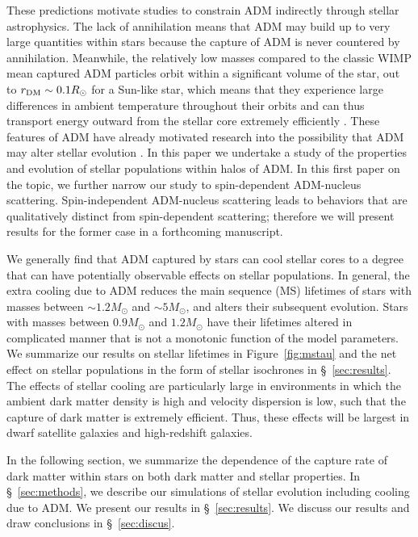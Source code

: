 \documentclass[useAMS,usenatbib]{mnras}
\begin{document}
  
  These predictions motivate studies to 
  constrain ADM indirectly through stellar astrophysics. The lack of 
  annihilation means that ADM may build up to very large
  quantities within stars because the capture of ADM is never countered 
  by annihilation. Meanwhile, the relatively low masses 
  compared to the classic WIMP mean captured ADM particles orbit within 
  a significant volume of the star, out to $r_{\mathrm{DM}} \sim 0.1 R_{\odot}$
  for a Sun-like star, which means that they experience large differences 
  in ambient temperature 
  throughout their orbits and can thus transport energy outward from the 
  stellar core extremely efficiently \citep{Spergel1985EffectInterior}. 
  These features of ADM have already motivated research into the possibility that 
  ADM may alter stellar evolution 
  \citep[e.g.][]{Taoso+10,Zentner2011AsymmetricDwarfs,Iocco+12,Lopes_Silk12,Casanellas_Lopes13,Casanellas+15,vincent_etal15,Murase_Shoemaker16,Lopes_silk19,Vincent2020}.
  In this paper we undertake a study of the properties and evolution of 
  stellar populations within halos of ADM. In this first paper on the topic, 
  we further narrow our study to spin-dependent ADM-nucleus scattering. 
  Spin-independent ADM-nucleus scattering leads to behaviors that are 
  qualitatively distinct from spin-dependent scattering; therefore we will 
  present results for the former case in a forthcoming manuscript. 

  We generally find that ADM captured by stars can cool 
  stellar cores to a degree that can have potentially 
  observable effects on stellar populations. In general, 
  the extra cooling due to ADM reduces the main sequence (MS) lifetimes 
  of stars with masses between $\sim 1.2 M_{\odot}$ and $\sim 5 M_{\odot}$, 
  and alters their subsequent evolution. Stars with masses between 
  $0.9 M_{\odot}$ and $1.2 M_{\odot}$ have their lifetimes altered in 
  complicated manner that is not a monotonic function of the model parameters. 
  We summarize our results on stellar lifetimes in Figure~\ref{fig:mstau} 
  and the net effect on stellar populations in the form of stellar isochrones in
  \S~\ref{sec:results}. The effects of stellar cooling are particularly large in 
  environments in which 
  the ambient dark matter density is high and 
  velocity dispersion is low, such that the capture of 
  dark matter is extremely efficient. 
  Thus, these effects will be largest in dwarf satellite galaxies 
  and high-redshift galaxies. 
  
  In the following section, we summarize the dependence of the capture rate of dark matter 
  within stars on both dark matter and stellar properties. In \S~\ref{sec:methods}, we describe
  our simulations of stellar evolution including cooling due to ADM. We present our results 
  in \S~\ref{sec:results}. We discuss our results and draw conclusions in \S~\ref{sec:discus}.
\end{document}
